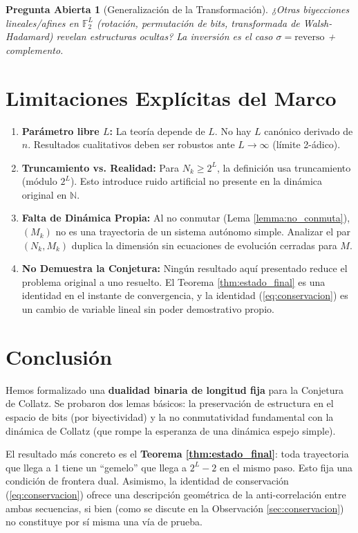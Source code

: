 \documentclass[11pt,a4paper]{article}
\newtheorem{question}{Pregunta Abierta}
\begin{document}
\begin{question}[Generalización de la Transformación]
\label{q:generalizacion}
¿Otras biyecciones lineales/afines en $\mathbb{F}_2^L$ (rotación, permutación de bits, transformada de Walsh-Hadamard) revelan estructuras ocultas? La inversión es el caso $\sigma = \text{reverso}$ + complemento.
\end{question}

\section{Limitaciones Explícitas del Marco}
\label{sec:limitaciones}

\begin{enumerate}
    \item \textbf{Parámetro libre $L$:} La teoría depende de $L$. No hay $L$ canónico derivado de $n$. Resultados cualitativos deben ser robustos ante $L \to \infty$ (límite 2-ádico).
    \item \textbf{Truncamiento vs. Realidad:} Para $N_k \ge 2^L$, la definición usa truncamiento (módulo $2^L$). Esto introduce ruido artificial no presente en la dinámica original en $\mathbb{N}$.
    \item \textbf{Falta de Dinámica Propia:} Al no conmutar (Lema \ref{lemma:no_conmuta}), $(M_k)$ no es una trayectoria de un sistema autónomo simple. Analizar el par $(N_k, M_k)$ duplica la dimensión sin ecuaciones de evolución cerradas para $M$.
    \item \textbf{No Demuestra la Conjetura:} Ningún resultado aquí presentado reduce el problema original a uno resuelto. El Teorema \ref{thm:estado_final} es una identidad en el instante de convergencia, y la identidad (\ref{eq:conservacion}) es un cambio de variable lineal sin poder demostrativo propio.
\end{enumerate}

\section{Conclusión}

Hemos formalizado una \textbf{dualidad binaria de longitud fija} para la Conjetura de Collatz. Se probaron dos lemas básicos: la preservación de estructura en el espacio de bits (por biyectividad) y la no conmutatividad fundamental con la dinámica de Collatz (que rompe la esperanza de una dinámica espejo simple).

El resultado más concreto es el \textbf{Teorema \ref{thm:estado_final}}: toda trayectoria que llega a 1 tiene un ``gemelo'' que llega a $2^L-2$ en el mismo paso. Esto fija una condición de frontera dual. Asimismo, la identidad de conservación (\ref{eq:conservacion}) ofrece una descripción geométrica de la anti-correlación entre ambas secuencias, si bien (como se discute en la Observación \ref{sec:conservacion}) no constituye por sí misma una vía de prueba.
\end{document}
